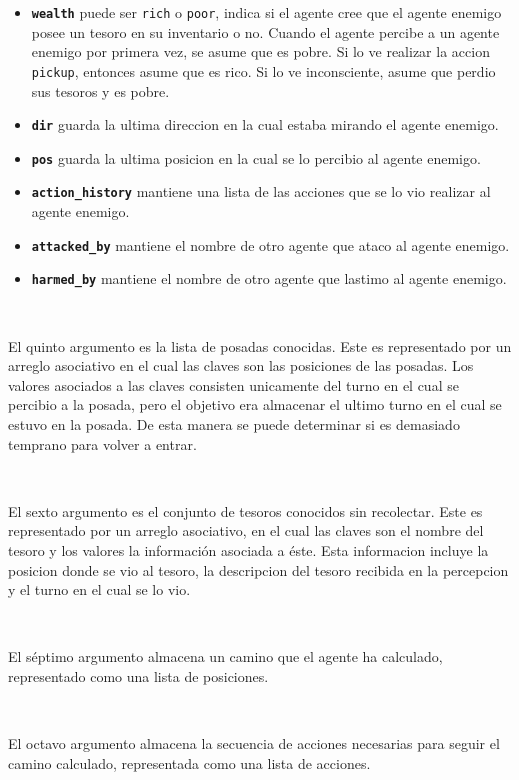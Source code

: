\documentclass[a4paper,12pt]{report}
\begin{document}
\begin{itemize}
\item \textbf{\texttt{wealth}} puede ser \texttt{rich} o \texttt{poor}, indica si el agente cree 
    que el agente enemigo posee un tesoro en su inventario o no.
    Cuando el agente percibe a un agente enemigo por primera vez, se asume que es pobre. 
    Si lo ve realizar la accion \texttt{pickup}, entonces asume que es rico.
    Si lo ve inconsciente, asume que perdio sus tesoros y es pobre. 
\item \textbf{\texttt{dir}} guarda la ultima direccion en la cual estaba mirando el agente enemigo.
\item \textbf{\texttt{pos}} guarda la ultima posicion en la cual se lo percibio al agente enemigo.
\item \textbf{\texttt{action\_history}} mantiene una lista de las acciones que se lo vio realizar
    al agente enemigo.
\item \textbf{\texttt{attacked\_by}} mantiene el nombre de otro agente que ataco al agente enemigo.
\item \textbf{\texttt{harmed\_by}} mantiene el nombre de otro agente que lastimo al agente enemigo.
\end{itemize}

\ 

El quinto argumento es la lista de posadas conocidas.
Este es representado por un arreglo asociativo en el cual las claves son las posiciones de las 
posadas. 
Los valores asociados a las claves consisten unicamente del turno en el cual se percibio a la posada,
pero el objetivo era almacenar el ultimo turno en el cual se estuvo en la posada. 
De esta manera se puede determinar si es demasiado temprano para volver a entrar.

\ 

El sexto argumento es el conjunto de tesoros conocidos sin recolectar.
Este es representado por un arreglo asociativo, en el cual las claves son el nombre del tesoro y 
los valores la informaci\'{o}n asociada a \'{e}ste. 
Esta informacion incluye la posicion donde se vio al tesoro, la descripcion del tesoro recibida en 
la percepcion y el turno en el cual se lo vio. 

\ 

El s\'{e}ptimo argumento almacena un camino que el agente ha calculado, representado como una lista 
de posiciones.

\ 

El octavo argumento almacena la secuencia de acciones necesarias para seguir el camino calculado, 
representada como una lista de acciones.
\end{document}
